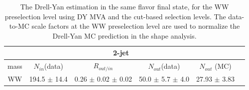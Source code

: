 \begin{table}
\begin{center}
\begin{tabular}{c c c c c c}
\hline
\hline
\multicolumn{5}{c}{2-jet} \\
\hline
       mass & $N_{in}$(data)        & $R_{out/in}$        & $N_{out}$(data) & $N_{out}$ (MC) \\ 
       WW & 194.5 $\pm$ 14.4 & 0.26 $\pm$ 0.02 $\pm$ 0.02 & 50.0 $\pm$ 5.7 $\pm$ 4.0  & 27.93 $\pm$ 3.83 \\
\hline
\end{tabular}
\caption{The Drell-Yan estimation in the same flavor final state, for the WW preselection level using DY MVA and 
the cut-based selection levels. The data-to-MC scale factors at the WW preselection level are used to 
normalize the Drell-Yan MC prediction in the shape analysis.}
\label{tab:dy}
\end{center}
\end{table}

